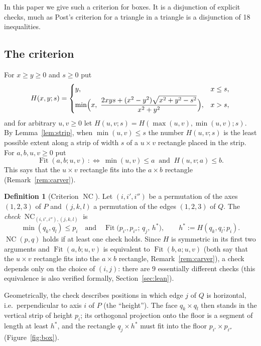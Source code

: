 \documentclass[11pt]{article}
\theoremstyle{definition}
\newtheorem{definition}[theorem]{Definition}
\theoremstyle{remark}
\newcommand{\Fit}{\operatorname{Fit}}
\newcommand{\NC}{\operatorname{NC}}
\begin{document}
In this paper we give such a criterion for boxes. It is a disjunction of explicit checks, much as
Post's criterion for a triangle in a triangle \cite{Post1993} is a disjunction of 18 inequalities.

\subsection*{The criterion}
For $x\ge y\ge0$ and $s\ge 0$ put
\begin{equation}\label{eq:H}
H(x,y;s)=\begin{cases}
y, & x\le s,\\[2pt]
\min\Bigl(x,\ \dfrac{2xys+(x^2-y^2)\sqrt{x^2+y^2-s^2}}{x^2+y^2}\Bigr), & x>s,
\end{cases}
\end{equation}
and for arbitrary $u,v\ge0$ let $H(u,v;s)=H(\max(u,v),\min(u,v);s)$. By Lemma~\ref{lem:strip},
when $\min(u,v)\le s$ the number $H(u,v;s)$ is the least possible extent along a strip of width $s$ of
a $u\times v$ rectangle placed in the strip. For $a,b,u,v\ge 0$ put
\[
\Fit(a,b;u,v)\ :\Longleftrightarrow\ \min(u,v)\le a\ \text{ and }\ H(u,v;a)\le b .
\]
This says that the $u\times v$ rectangle fits into the $a\times b$ rectangle (Remark~\ref{rem:carver}).

\begin{definition}[Criterion $\NC$]\label{def:NC}
Let $(i,i',i'')$ be a permutation of the axes $(1,2,3)$ of $P$ and $(j,k,l)$ a permutation of the
edges $(1,2,3)$ of $Q$. The \emph{check} $\NC_{(i,i',i''),(j,k,l)}$ is
\[
\min(q_k,q_l)\le p_i\quad\text{and}\quad \Fit\bigl(p_{i'},p_{i''};\,q_j,\,h^*\bigr),\qquad
h^*:=H(q_k,q_l;p_i).
\]
$\NC(p,q)$ holds if at least one check holds. Since $H$ is symmetric in its first two arguments
and $\Fit(a,b;u,v)$ is equivalent to $\Fit(b,a;u,v)$ (both say that the $u\times v$ rectangle fits
into the $a\times b$ rectangle, Remark~\ref{rem:carver}), a check depends only on the choice of
$(i,j)$: there are $9$ essentially different checks (this equivalence is also verified formally,
Section~\ref{sec:lean}).
\end{definition}

Geometrically, the check describes positions in which edge $j$ of $Q$ is horizontal, i.e.\
perpendicular to axis $i$ of $P$ (the ``height''). The face $q_k\times q_l$ then stands in the vertical
strip of height $p_i$; its orthogonal projection onto the floor is a segment of length at least $h^*$, and the rectangle
$q_j\times h^*$ must fit into the floor $p_{i'}\times p_{i''}$ (Figure~\ref{fig:box}).
\end{document}
